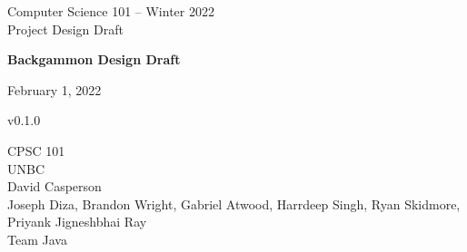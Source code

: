 \begin{titlepage}
    \begin{center}
        \vspace{1.5cm}
        
        \Large
        Computer Science 101 -- Winter 2022 \\
        Project Design Draft
        
        \vspace*{4cm}
            
        \huge
        \textbf{Backgammon Design Draft}
        \vspace*{0.4cm}

        \large
        February 1, 2022 \\
        \vspace*{0.2cm}

        \footnotesize
        v0.1.0
        \vspace{1.5cm}

        \vfill
        CPSC 101 \\
        UNBC \\
        David Casperson \\

        \vspace{0.8cm}
        Joseph Diza, Brandon Wright, Gabriel Atwood, Harrdeep Singh, Ryan Skidmore, Priyank Jigneshbhai Ray \\
        Team Java
    \end{center}
\end{titlepage}
